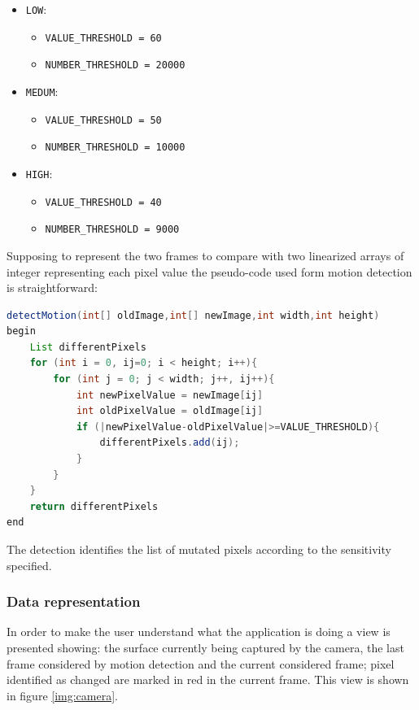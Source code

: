 \documentclass[conference, 11pt]{IEEEtran}
\begin{document}
\begin{itemize}
	\item \texttt{LOW}:
		\begin{itemize}
		\item \texttt{VALUE\_THRESHOLD = 60}
		\item \texttt{NUMBER\_THRESHOLD = 20000}
		\end{itemize}
	\item \texttt{MEDUM}:
		\begin{itemize}
		\item \texttt{VALUE\_THRESHOLD = 50}
		\item \texttt{NUMBER\_THRESHOLD = 10000}
		\end{itemize}
	\item \texttt{HIGH}:
		\begin{itemize}
		\item \texttt{VALUE\_THRESHOLD = 40}
		\item \texttt{NUMBER\_THRESHOLD = 9000}
		\end{itemize}
\end{itemize}

Supposing to represent the two frames to compare with two linearized arrays of integer representing each pixel value the pseudo-code used form motion detection is straightforward:

\begin{lstlisting}[language=Java, caption=Pseudocode for motion detection]
detectMotion(int[] oldImage,int[] newImage,int width,int height)
begin
	List differentPixels
	for (int i = 0, ij=0; i < height; i++){
		for (int j = 0; j < width; j++, ij++){
			int newPixelValue = newImage[ij]
			int oldPixelValue = oldImage[ij]
			if (|newPixelValue-oldPixelValue|>=VALUE_THRESHOLD){
	            differentPixels.add(ij);
			}
		}
	}
	return differentPixels		
end
\end{lstlisting}

The detection identifies the list of mutated pixels according to the sensitivity specified.\\

\subsubsection{\textbf{Data representation}}
In order to make the user understand what the application is doing a view is presented showing: the surface currently being captured by the camera, the last frame considered by motion detection and the current considered frame; pixel identified as changed are marked in red in the current frame. This view is shown in figure \ref{img:camera}.
\end{document}
